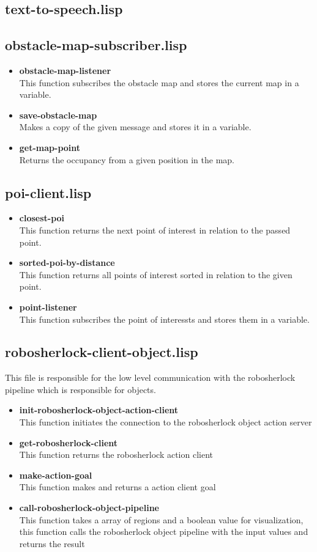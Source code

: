\documentclass[main.tex]{subfiles}
\begin{document}
		\subsection{text-to-speech.lisp}
		\subsection{obstacle-map-subscriber.lisp}
	    \begin{itemize}
	    	\item \textbf{obstacle-map-listener} \\
	    	This function subscribes the obstacle map and stores the current map in a variable.
	    	\item \textbf{save-obstacle-map} \\
	    	Makes a copy of the given message and stores it in a variable.
	    	\item \textbf{get-map-point} \\
	    	Returns the occupancy from a given position in the map.
	    \end{itemize}
		\subsection{poi-client.lisp}
 		\begin{itemize}
	    	\item \textbf{closest-poi} \\
	    	This function returns the next point of interest in relation to the passed point.
	    	\item \textbf{sorted-poi-by-distance} \\
	    	This function returns all points of interest sorted in relation to the given point.
	    	\item \textbf{point-listener} \\
	    	This function subscribes the point of interessts and stores them in a variable.
	    \end{itemize}
		\subsection{robosherlock-client-object.lisp}
		This file is responsible for the low level communication with the robosherlock pipeline which is responsible for objects.
		\begin{itemize}
			\item \textbf{init-robosherlock-object-action-client} \\
			This function initiates the connection to the robosherlock object action server
			\item \textbf{get-robosherlock-client} \\
			This function returns the robosherlock action client
			\item \textbf{make-action-goal} \\
			This function makes and returns a action client goal
			\item \textbf{call-robosherlock-object-pipeline} \\
			This function takes a array of regions and a boolean value for visualization, this function calls the robosherlock object pipeline with the input values and returns the result
		\end{itemize}
\end{document}
